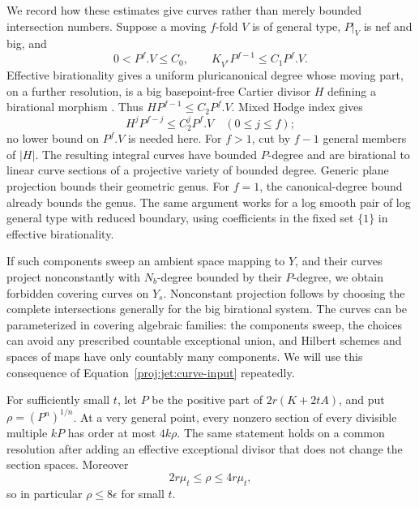 We record how these estimates give curves rather than merely
bounded intersection numbers.  Suppose a moving \(f\)-fold \(V\)
is of general type, \(P|_V\) is nef and big, and
\begin{equation}\label{proj:jet:curve-input}
 0<P^f.V\le C_0,\qquad
 K_{V^*}P^{f-1}\le C_1P^f.V.
\end{equation}
Effective birationality gives a uniform pluricanonical degree whose
moving part, on a further resolution, is a big basepoint-free
Cartier divisor \(H\) defining a birational morphism
\cite[Theorem~4.0.1]{Proj-HMX2018}.  Thus
\(HP^{f-1}\le C_2P^f.V\).  Mixed Hodge index gives
\[
 H^jP^{f-j}\le C_2^jP^f.V\quad(0\le j\le f);
\]
no lower bound on \(P^f.V\) is needed here.  For \(f>1\), cut by
\(f-1\) general members of \(|H|\).  The resulting integral curves
have bounded \(P\)-degree and are birational to linear curve
sections of a projective variety of bounded degree.  Generic plane
projection bounds their geometric genus.  For \(f=1\), the
canonical-degree bound already bounds the genus.
The same argument works for a log smooth pair of log general type
with reduced boundary, using coefficients in the fixed set
\(\{1\}\) in effective birationality.

If such components sweep an ambient space mapping to \(Y\), and
their curves project nonconstantly with \(N_b\)-degree bounded by
their \(P\)-degree, we obtain forbidden covering curves on \(Y_s\).
Nonconstant projection follows by choosing the complete intersections
generally for the big birational system.  The curves can be
parameterized in covering algebraic families: the components sweep,
the choices can avoid any prescribed countable exceptional union,
and Hilbert schemes and spaces of maps have only countably many
components.  We will use this consequence of
Equation~\eqref{proj:jet:curve-input} repeatedly.

\begin{proposition}\label{proj:prop:scalar-jets}
For sufficiently small \(t\), let \(P\) be the positive part of
\(2r(K+2tA)\), and put \(\rho=(P^n)^{1/n}\).
At a very general point, every nonzero section of every divisible
multiple \(kP\) has order at most \(4k\rho\).
The same statement holds on a common resolution after adding an
effective exceptional divisor that does not change the section
spaces.  Moreover
\[
 2r\mu_t\le\rho\le4r\mu_t,
\]
so in particular \(\rho\le8\epsilon\) for small \(t\).
\end{proposition}

